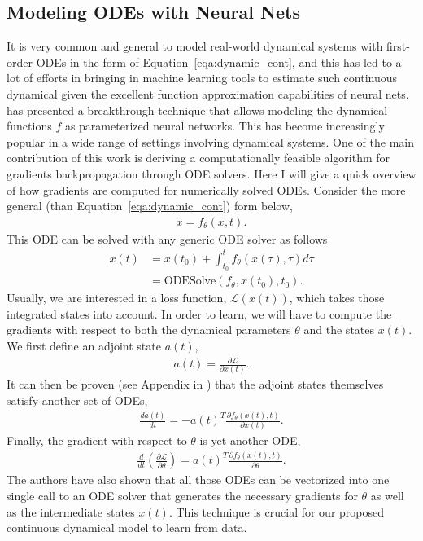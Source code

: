 \documentclass[conference]{IEEEtran}
\begin{document}
\subsection{Modeling ODEs with Neural Nets}\label{sec:neural_ode}
It is very common and general to model real-world dynamical systems with
first-order ODEs in the form of
Equation~\ref{eqa:dynamic_cont}, and this has led to a lot of efforts in
bringing in machine learning tools to estimate such continuous dynamical
given the excellent function approximation capabilities of neural nets.
\citet{neural_ode} has presented a breakthrough technique that allows modeling
the dynamical functions $f$ as parameterized neural networks. This has
become increasingly popular in a wide range of settings involving dynamical systems.
One of the main contribution of this work is deriving a computationally feasible algorithm
for gradients backpropagation through ODE solvers. Here I will give a quick
overview of how gradients are computed for numerically solved ODEs. Consider
the more general (than Equation~\ref{eqa:dynamic_cont}) form below,
\begin{gather}
  \dot{x} = f_\theta(x, t).
\end{gather}
This ODE can be solved with any generic ODE solver as follows
\begin{align}
  x(t) &= x(t_0) + \int_{t_0}^{t} f_\theta(x(\tau), \tau) d\tau \\
       &= \text{ODESolve}(f_\theta, x(t_0), t_0).
\end{align}
Usually, we are interested in a loss function, $\mathcal{L}(x(t))$, which
takes those integrated states into account. In order to learn, we will have
to compute the gradients with respect to both the dynamical parameters $\theta$
and the states $x(t)$. We first define an adjoint state $a(t)$,
\begin{gather}
  a(t) = \frac{\partial \mathcal{L}}{\partial x(t)}.
\end{gather}
It can then be proven (see Appendix in \cite{neural_ode}) that the adjoint states
themselves satisfy another set of ODEs,
\begin{gather}
  \frac{da(t)}{dt} = -a(t)^T \frac{\partial f_\theta(x(t), t)}{\partial x(t)}.
\end{gather}
Finally, the gradient with respect to $\theta$ is yet another ODE,
\begin{gather}
  \frac{d}{dt}\left(\frac{\partial \mathcal{L}}{\partial \theta}\right) =
  a(t)^T \frac{\partial f_\theta(x(t), t)}{\partial \theta}.
\end{gather}
The authors have also shown that all those ODEs can be vectorized into one
single call to an ODE solver that generates the necessary gradients for
$\theta$ as well as the intermediate states $x(t)$. This technique is crucial
for our proposed continuous dynamical model to learn from data.
\end{document}
